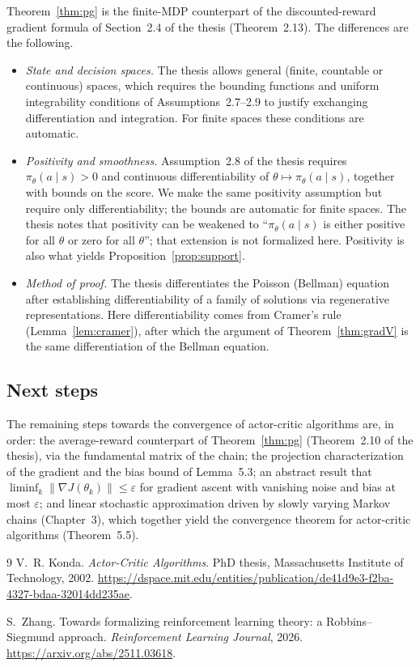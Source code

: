 \documentclass[11pt]{article}
\theoremstyle{definition}
\theoremstyle{remark}
\begin{document}
Theorem~\ref{thm:pg} is the finite-MDP counterpart of the discounted-reward
gradient formula of Section~2.4 of the thesis (Theorem~2.13). The differences
are the following.
\begin{itemize}
\item \emph{State and decision spaces.} The thesis allows general (finite,
  countable or continuous) spaces, which requires the bounding functions and
  uniform integrability conditions of Assumptions~2.7--2.9 to justify
  exchanging differentiation and integration. For finite spaces these
  conditions are automatic.
\item \emph{Positivity and smoothness.} Assumption~2.8 of the thesis requires
  $\pi_\theta(a\mid s) > 0$ and continuous differentiability of
  $\theta\mapsto\pi_\theta(a\mid s)$, together with bounds on the score. We make the
  same positivity assumption but require only differentiability; the bounds are
  automatic for finite spaces. The thesis notes that positivity can be weakened
  to ``$\pi_\theta(a\mid s)$ is either positive for all $\theta$ or zero for all
  $\theta$''; that extension is not formalized here. Positivity is also what
  yields Proposition~\ref{prop:support}.
\item \emph{Method of proof.} The thesis differentiates the Poisson (Bellman)
  equation after establishing differentiability of a family of solutions via
  regenerative representations. Here differentiability comes from Cramer's rule
  (Lemma~\ref{lem:cramer}), after which the argument of
  Theorem~\ref{thm:gradV} is the same differentiation of the Bellman equation.
\end{itemize}

\subsection{Next steps}

The remaining steps towards the convergence of actor-critic algorithms are,
in order:
the average-reward counterpart of Theorem~\ref{thm:pg} (Theorem~2.10 of the
thesis), via the fundamental matrix of the chain;
the projection characterization of the gradient and the bias bound of
Lemma~5.3;
an abstract result that $\liminf_k \|\nabla J(\theta_k)\| \le \varepsilon$ for gradient
ascent with vanishing noise and bias at most $\varepsilon$;
and linear stochastic approximation driven by slowly varying Markov chains
(Chapter~3), which together yield the convergence theorem for actor-critic
algorithms (Theorem~5.5).

\begin{thebibliography}{9}
V.~R. Konda.
\newblock \emph{Actor-Critic Algorithms}.
\newblock PhD thesis, Massachusetts Institute of Technology, 2002.
\newblock \url{https://dspace.mit.edu/entities/publication/de41d9e3-f2ba-4327-bdaa-32014dd235ae}.

S.~Zhang.
\newblock Towards formalizing reinforcement learning theory: a
  Robbins--Siegmund approach.
\newblock \emph{Reinforcement Learning Journal}, 2026.
\newblock \url{https://arxiv.org/abs/2511.03618}.
\end{thebibliography}
\end{document}
